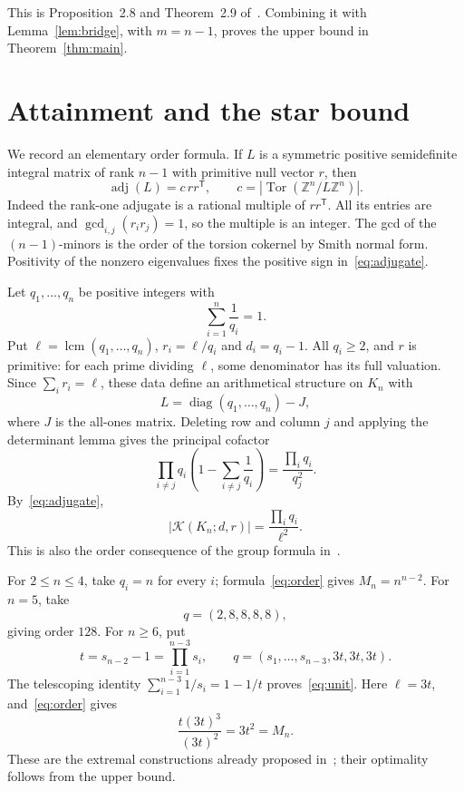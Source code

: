 \documentclass[11pt]{article}
\theoremstyle{remark}
\DeclareMathOperator{\diag}{diag}
\DeclareMathOperator{\lcm}{lcm}
\DeclareMathOperator{\Tor}{Tor}
\DeclareMathOperator{\adj}{adj}
\newcommand{\Z}{\mathbb Z}
\newcommand{\K}{\mathcal K}
\begin{document}
This is Proposition~2.8 and Theorem~2.9 of~\cite{AKLN}. Combining it with Lemma~\ref{lem:bridge}, with $m=n-1$, proves the upper bound in Theorem~\ref{thm:main}.

\section{Attainment and the star bound}

We record an elementary order formula. If $L$ is a symmetric positive semidefinite integral matrix of rank $n-1$ with primitive null vector $r$, then
\begin{equation}\label{eq:adjugate}
 \adj(L)=c\,rr^{\mathsf T},\qquad
 c=|\Tor(\Z^n/L\Z^n)|.
\end{equation}
Indeed the rank-one adjugate is a rational multiple of $rr^{\mathsf T}$. All its entries are integral, and $\gcd_{i,j}(r_i r_j)=1$, so the multiple is an integer. The gcd of the $(n-1)$-minors is the order of the torsion cokernel by Smith normal form. Positivity of the nonzero eigenvalues fixes the positive sign in~\eqref{eq:adjugate}.

Let $q_1,\ldots,q_n$ be positive integers with
\begin{equation}\label{eq:unit}
 \sum_{i=1}^n\frac1{q_i}=1.
\end{equation}
Put $\ell=\lcm(q_1,\ldots,q_n)$, $r_i=\ell/q_i$ and $d_i=q_i-1$. All $q_i\geq2$, and $r$ is primitive: for each prime dividing $\ell$, some denominator has its full valuation. Since $\sum_i r_i=\ell$, these data define an arithmetical structure on $K_n$ with
\[
 L=\diag(q_1,\ldots,q_n)-J,
\]
where $J$ is the all-ones matrix. Deleting row and column $j$ and applying the determinant lemma gives the principal cofactor
\[
 \prod_{i\ne j}q_i\left(1-\sum_{i\ne j}\frac1{q_i}\right)
 =\frac{\prod_i q_i}{q_j^2}.
\]
By~\eqref{eq:adjugate},
\begin{equation}\label{eq:order}
 |\K(K_n;d,r)|=\frac{\prod_iq_i}{\ell^2}.
\end{equation}
This is also the order consequence of the group formula in~\cite{ADGL}.

For $2\leq n\leq4$, take $q_i=n$ for every $i$; formula~\eqref{eq:order} gives $M_n=n^{n-2}$. For $n=5$, take
\[
 q=(2,8,8,8,8),
\]
giving order $128$. For $n\geq6$, put
\begin{equation}\label{eq:extremal}
 t=s_{n-2}-1=\prod_{i=1}^{n-3}s_i,\qquad
 q=(s_1,\ldots,s_{n-3},3t,3t,3t).
\end{equation}
The telescoping identity $\sum_{i=1}^{n-3}1/s_i=1-1/t$ proves~\eqref{eq:unit}. Here $\ell=3t$, and~\eqref{eq:order} gives
\[
 \frac{t(3t)^3}{(3t)^2}=3t^2=M_n.
\]
These are the extremal constructions already proposed in~\cite{ADGL}; their optimality follows from the upper bound.
\end{document}
